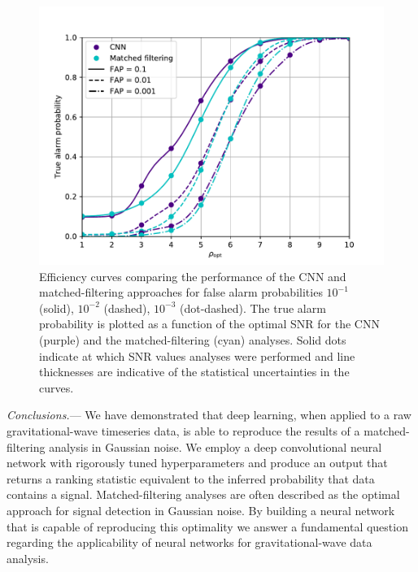 \documentclass[%
showpacs,
 amsmath,amssymb,
 aps,
 twocolumn,
 prl,
 reprint,
floatfix,
]{revtex4-1}
\begin{document}
%
%
\begin{figure}[]
\includegraphics[width=\columnwidth] {figures/efficiency.pdf}
\caption{Efficiency curves comparing the performance of the \ac{CNN} and
matched-filtering approaches for false alarm probabilities $10^{-1}$ (solid),
$10^{-2}$ (dashed), $10^{-3}$ (dot-dashed). The true alarm probability is
plotted as a function of the optimal \ac{SNR} for the \ac{CNN} (purple) and the
matched-filtering (cyan) analyses. Solid dots indicate at which \ac{SNR} values
analyses were performed and line thicknesses are indicative of the
statistical uncertainties in the curves.\label{fig:efficiency_curve}} 
\end{figure}

%
%
\textit{Conclusions.}--- 
%
%
We have demonstrated that deep learning, when applied to a raw
gravitational-wave timeseries data, {\color{red}is able to reproduce the
results of a matched-filtering analysis in Gaussian noise}. We employ a deep
convolutional neural network with rigorously tuned hyperparameters and produce
an output that returns a ranking statistic equivalent to the inferred
probability that data contains a signal. Matched-filtering analyses are often
described as the optimal approach for signal detection in Gaussian noise. By
building a neural network that is capable of {\color{red}reproducing this
optimality} we answer a fundamental question regarding the applicability of
neural networks for gravitational-wave data analysis. 
\end{document}

